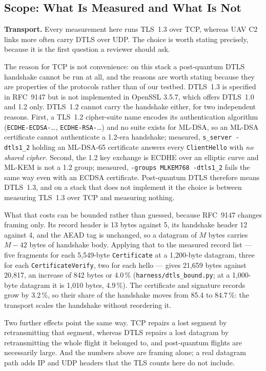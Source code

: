 \documentclass[drones,article,submit,pdftex,moreauthors]{Definitions/mdpi}
\newcommand{\mlkem}{ML-KEM}
\newcommand{\mldsa}{ML-DSA}
\newcommand{\tls}{TLS}
\begin{document}
\subsection{Scope: What Is Measured and What Is Not}
\label{sec:scope}

\textbf{Transport.} Every measurement here runs \tls{}~1.3 over TCP,
whereas UAV C2 links more often carry DTLS over UDP. The choice is worth
stating precisely, because it is the first question a reviewer should
ask.

The reason for TCP is not convenience: on this stack a post-quantum
DTLS handshake cannot be run at all, and the reasons are worth stating
because they are properties of the protocols rather than of our testbed.
DTLS~1.3 is specified in RFC~9147 but is not implemented in OpenSSL
3.5.7, which offers DTLS~1.0 and 1.2 only. DTLS~1.2 cannot carry the
handshake either, for two independent reasons. First, a \tls{}~1.2
cipher-suite name encodes its authentication algorithm
(\texttt{ECDHE-ECDSA-}\ldots, \texttt{ECDHE-RSA-}\ldots) and no suite
exists for \mldsa{}, so an \mldsa{} certificate cannot authenticate a
1.2-era handshake; measured, \texttt{s\_server -dtls1\_2} holding an
\mldsa{}-65 certificate answers every \texttt{ClientHello} with
\emph{no shared cipher}. Second, the 1.2 key exchange is ECDHE over an
elliptic curve and \mlkem{} is not a 1.2 group; measured,
\texttt{-groups MLKEM768 -dtls1\_2} fails the same way even with an ECDSA
certificate. Post-quantum DTLS therefore means DTLS~1.3, and on a stack
that does not implement it the choice is between measuring \tls{}~1.3
over TCP and measuring nothing.

What that costs can be bounded rather than guessed, because RFC~9147
changes framing only. Its record header is 13 bytes against 5, its
handshake header 12 against 4, and the AEAD tag is unchanged, so a
datagram of $M$ bytes carries $M-42$ bytes of handshake body. Applying
that to the measured record list --- five fragments for each 5{,}549-byte
\texttt{Certificate} at a 1{,}200-byte datagram, three for each
\texttt{CertificateVerify}, two for each hello --- gives 21{,}659 bytes
against 20{,}817, an increase of 842 bytes or 4.0\,\%
(\texttt{harness/dtls\_bound.py}; at a 1{,}000-byte datagram it is
1{,}010 bytes, 4.9\,\%). The certificate and signature records grow by
3.2\,\%, so their share of the handshake moves from 85.4 to 84.7\,\%:
the transport scales the handshake without reordering it.

Two further effects point the same way. TCP repairs a lost segment by
retransmitting that segment, whereas DTLS repairs a lost datagram by
retransmitting the whole flight it belonged to, and post-quantum flights
are necessarily large. And the numbers above are framing alone; a real
datagram path adds IP and UDP headers that the \tls{} counts here do not
include.
\end{document}
